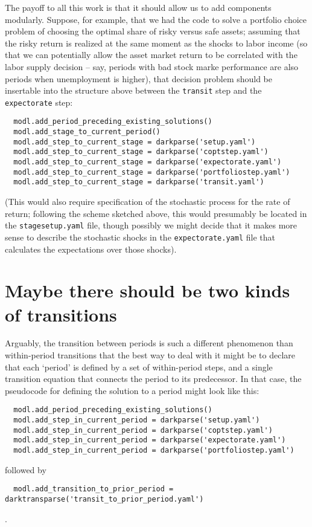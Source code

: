 \documentclass[SolvingMicroDSOPs]{subfiles}
\begin{document}
The payoff to all this work is that it should allow us to add components modularly.  Suppose, for example, that we had the code to solve a portfolio choice problem of choosing the optimal share of risky versus safe assets; assuming that the risky return is realized at the same moment as the shocks to labor income (so that we can potentially allow the asset market return to be correlated with the labor supply decision -- say, periods with bad stock marke performance are also periods when unemployment is higher), that decision problem should be insertable into the structure above between the \texttt{transit} step and the \texttt{expectorate} step:
\begin{verbatim}
  modl.add_period_preceding_existing_solutions()
  modl.add_stage_to_current_period()
  modl.add_step_to_current_stage = darkparse('setup.yaml')
  modl.add_step_to_current_stage = darkparse('coptstep.yaml')
  modl.add_step_to_current_stage = darkparse('expectorate.yaml')
  modl.add_step_to_current_stage = darkparse('portfoliostep.yaml')
  modl.add_step_to_current_stage = darkparse('transit.yaml')
\end{verbatim}

(This would also require specification of the stochastic process for the rate of return; following the scheme sketched above, this would presumably be located in the \texttt{stagesetup.yaml} file, though possibly we might decide that it makes more sense to describe the stochastic shocks in the \texttt{expectorate.yaml} file that calculates the expectations over those shocks).

\section{Maybe there should be two kinds of transitions}

Arguably, the transition between periods is such a different phenomenon than within-period transitions that the best way to deal with it might be to declare that each `period' is defined by a set of within-period steps, and a single transition equation that connects the period to its predecessor.  In that case, the pseudocode for defining the solution to a period might look like this:

\begin{verbatim}
  modl.add_period_preceding_existing_solutions()
  modl.add_step_in_current_period = darkparse('setup.yaml')
  modl.add_step_in_current_period = darkparse('coptstep.yaml')
  modl.add_step_in_current_period = darkparse('expectorate.yaml')
  modl.add_step_in_current_period = darkparse('portfoliostep.yaml')
\end{verbatim}
followed by
\begin{verbatim}
  modl.add_transition_to_prior_period = darktransparse('transit_to_prior_period.yaml')
\end{verbatim}
.




\onlyinsubfile{}
\end{document}
